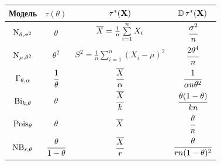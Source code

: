 \begin{mytable}
	\begin{center}
		\caption{Эффективные оценки в регулярных моделях.}
		\begin{tabular}{|c|c|c|c|}
			\hline Модель & $\tau(\theta)$ & $\tau^*(\mathbf{X})$ & $\operatorname{\mathbb{D}} \tau^*(\mathbf{X})$\\
			\hline $\operatorname{\mathrm{N}}_{\theta, \sigma^2}$ & $\theta$ & $\overline{X} = \frac{1}{n} \sum\limits_{i=1}^{n} X_i$ & $\cfrac{\sigma^2}{n}$\\[12pt]
			\hline \mylinespace[7.5pt] $\operatorname{\mathrm{N}}_{\mu, \theta^2}$ & $\theta^2$ & $S^2 = \frac{1}{n} \sum\limits_{i=1}^{n} \left(X_i - \mu\right)^2$ & $\cfrac{2\theta^4}{n}$\\[12pt]
			\hline \mylinespace[7.5pt] $\operatorname{\Gamma}_{\theta, \alpha}$ & $\cfrac{1}{\theta}$ & $\cfrac{\overline{X}}{\alpha}$ & $\cfrac{1}{\alpha n \theta^2}$\\[12pt]
			\hline \mylinespace[7.5pt] $\operatorname{\mathrm{Bi}}_{k, \theta}$ & $\theta$ & $\cfrac{\overline{X}}{k}$ & $\cfrac{\theta(1 - \theta)}{kn}$\\[12pt]
			\hline $\operatorname{\mathrm{Pois}}_{\theta}$ & $\theta$ & $\overline{X}$ & $\cfrac{\theta}{n}$\\[12pt]
			\hline \mylinespace[7.5pt] $\operatorname{\mathrm{NB}}_{r, \theta}$ & $\cfrac{\theta}{1 - \theta}$ & $\cfrac{\overline{X}}{r}$ & $\cfrac{\theta}{rn(1 - \theta)^2}$\\[12pt]
			\hline
		\end{tabular}
	\end{center}
\end{mytable}

